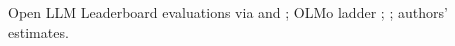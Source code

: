 \begin{table}[tp]
\begin{tablenotes}[Source]Open LLM Leaderboard evaluations via \citet{ruan2024observational} and \citet{maiapolo2024sloth}; OLMo ladder \citep{bhagia2024establishing}; \citet{gadre2024language}; authors' estimates.\end{tablenotes}
\end{table}
